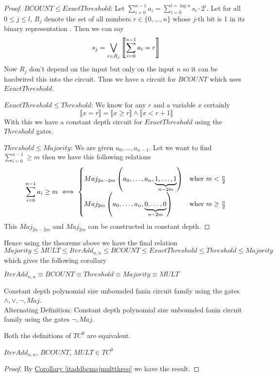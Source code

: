 \begin{proof}
	\underline{$BCOUNT\leq ExactThreshold$}: Let $\sum_{i=0}^{n-1}a_i=\sum_{i=0}^{l=\log n}s_i\cdot 2^i$. Let for all $0\leq j\leq l$, $R_j$ denote the set of all numbers $r\in \{0,\dots,n\}$ whose $j$-th bit is 1 in its binary representation . Then we can say $$s_j=\bigvee_{r\in R_j}\left\llbracket \sum_{i=0}^{n-1}a_i=r\right\rrbracket$$Now $R_j$ don't depend on the input but only on the input $n$ so it can be hardwired this into the circuit. Thus we have a circuit for $BCOUNT$ which uses $ExactThreshold$.
	
	\underline{$ExactThreshold\leq Threshold$}: We know for any $r$ and a variable $x$ certainly $$\llbracket x=r\rrbracket= \llbracket x\geq r\rrbracket \wedge  \llbracket x< r+1\rrbracket$$With this we have a constant depth circuit for $ExactThreshold$ using the $Threshold$ gates.
	
	\underline{$Threshold\leq Majority$}: We are given $a_0,\dots,a_{n-1}$. Let we want to find $\sum_{i=0}^{n-1}\geq m$ then we have this following relations $$\sum_{i=0}^{n-1}a_i\geq m\iff \begin{cases}
		Maj_{2n-2m}\left(a_0,\dots, a_n,\underbrace{1,\dots,1}_{n-2m}\right) & \text{wher $m<\frac{n}{2}$}\\
		Maj_{2m}\left(a_0,\dots, a_n,\underbrace{0,\dots,0}_{n-2m}\right) & \text{wher $m\geq\frac{n}{2}$}
	\end{cases}$$
	This $Maj_{2n-2m}$ and $Maj_{2m}$ can be constructed in constant depth.
\end{proof}

\begin{remark}
	Hence using the theorems above we have the final relation $$Majority\leq MULT\leq IterAdd_{n,n}\leq BCOUNT\leq ExactThreshold\leq Threshold\leq Majority$$ which gives the following corollary
\end{remark}

\begin{corollary}\label{itaddbcmajmultthreq}
	$IterAdd_{n,n}\equiv BCOUNT\equiv Threshold \equiv Majority \equiv MULT$
\end{corollary}


\begin{definition}[$TC^0$]
	Constant depth polynomial size unbounded fanin circuit family using the gates $\wedge, \vee, \neg,Maj$.\\
	Alternating Definition: Constant depth polynomial size unbounded fanin circuit family using the gates $ \neg,Maj$.
\end{definition}
\begin{theorem}
	Both the definitions of $TC^0$ are equivalent.
\end{theorem}

\begin{theorem}
	$IterAdd_{n,n}$, $BCOUNT$, $MULT\in TC^0$
\end{theorem}
\begin{proof}
	By \hyperref[itaddbcmajmultthreq]{Corollary \ref{itaddbcmajmultthreq}} we have the result.
\end{proof}
